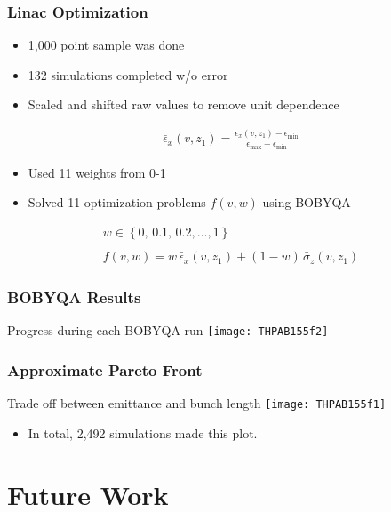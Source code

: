 \documentclass{beamer}
\begin{document}
\begin{frame}
	\frametitle{Linac Optimization}
	 \begin{itemize}
		  	\item{1,000 point sample was done}
		  	\item{132 simulations completed w/o error}
		  	\item{Scaled and shifted raw values to remove unit dependence}
	 \end{itemize}
	 \begin{align*}
	 \bar{\epsilon}_x (v,z_1) = \frac{ \epsilon_x (v,z_1) - \epsilon_{\min} } { \epsilon_{\max} - \epsilon_{\min} }
	 \end{align*}
	 
	 \begin{itemize}
	  	\item{Used 11 weights from 0-1}
	  	\item{Solved 11 optimization problems $f(v,w)$ using BOBYQA}
	 \end{itemize}
	 \begin{gather*}
	 w\in\left\{ 0, \,0.1, \,0.2, \ldots, 1 \right\}\\ \\
	 f(v,w) = w \,\bar{\epsilon}_x(v,z_1) + (1-w)\, \bar{\sigma}_z(v,z_1)
	 \end{gather*}
	

\end{frame}

\begin{frame}
	\frametitle{BOBYQA Results}
	Progress during each BOBYQA run
	\texttt{[image: THPAB155f2]}
\end{frame}

\begin{frame}
	\frametitle{Approximate Pareto Front}
	\centering
	Trade off between emittance and bunch length
	\texttt{[image: THPAB155f1]}
	\begin{itemize}
		\item In total, 2,492 simulations made this plot.
	\end{itemize}
\end{frame}

\section{Future Work}
\end{document}
